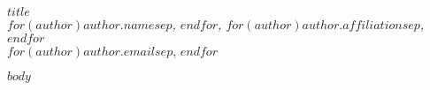 \documentclass[12pt,a4paper]{article}
\begin{document}
\raggedbottom
\begin{center}
\textbf{$title$}\\
\vspace{0.5em}
\textit{$for(author)$$author.name$$sep$, $endfor$, $for(author)$$author.affiliation$$sep$, $endfor$}\\
\vspace{0.25em}
$for(author)$$author.email$$sep$, $endfor$
\end{center}

$body$

\renewcommand\bibname{References} %
\end{document}

